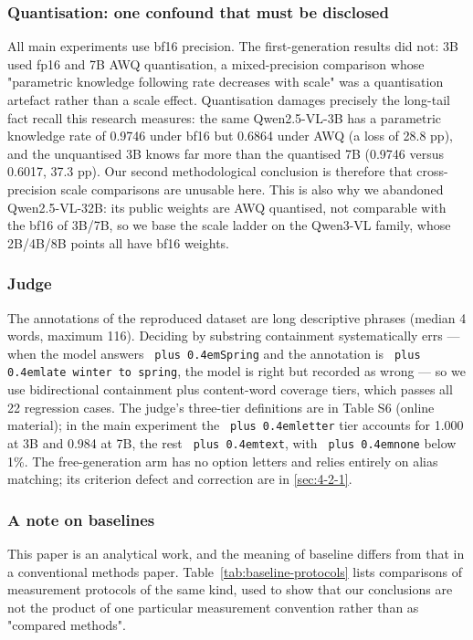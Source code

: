 \documentclass[pdflatex,sn-basic,Numbered]{sn-jnl}
\theoremstyle{thmstyleone}
\theoremstyle{thmstyletwo}
\theoremstyle{thmstylethree}
\DeclareRobustCommand{\code}[1]{\texttt{\spaceskip=0pt plus 0.4em\relax#1}}
\begin{document}
\subsubsection{Quantisation: one confound that must be disclosed}
\label{sec:4-3-4}

All main experiments use bf16 precision. The first-generation results did not: 3B used fp16 and
7B AWQ quantisation, a mixed-precision comparison whose "parametric knowledge following rate
decreases with scale" was a quantisation artefact rather than a scale effect. Quantisation
damages precisely the long-tail fact recall this research measures: the same Qwen2.5-VL-3B has
a parametric knowledge rate of 0.9746 under bf16 but 0.6864 under AWQ (a loss of 28.8 pp), and
the unquantised 3B knows far more than the quantised 7B (0.9746 versus 0.6017, 37.3 pp). Our
second methodological conclusion is therefore that cross-precision scale comparisons are
unusable here. This is also why we abandoned Qwen2.5-VL-32B: its public weights are AWQ
quantised, not comparable with the bf16 of 3B/7B, so we base the scale ladder on the Qwen3-VL
family, whose 2B/4B/8B points all have bf16 weights.

\subsubsection{Judge}
\label{sec:4-3-5}

The annotations of the reproduced dataset are long descriptive phrases (median 4 words,
maximum 116). Deciding by substring containment systematically errs — when the model answers
\code{Spring} and the annotation is \code{late winter to spring}, the model is right but recorded as
wrong — so we use bidirectional containment plus content-word coverage tiers, which passes all
22 regression cases. The judge's three-tier definitions are in Table S6 (online material); in the main experiment the \code{letter} tier accounts for 1.000 at 3B and 0.984 at 7B,
the rest \code{text}, with \code{none} below 1\%. The free-generation arm has no option letters and relies
entirely on alias matching; its criterion defect and correction are in \ref{sec:4-2-1}.

\subsubsection{A note on baselines}
\label{sec:4-3-6}

This paper is an analytical work, and the meaning of baseline differs from that in a
conventional methods paper. Table~\ref{tab:baseline-protocols} lists comparisons of measurement protocols of the
same kind, used to show that our conclusions are not the product of one particular
measurement convention rather than as "compared methods".
\end{document}

